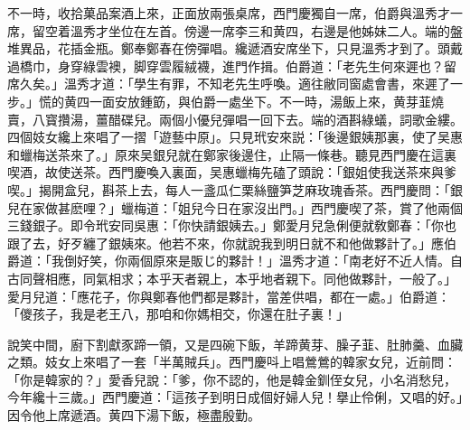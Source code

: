 不一時，收拾菓品案酒上來，正面放兩張桌席，西門慶獨自一席，伯爵與溫秀才一席，留空着溫秀才坐位在左首。傍邊一席李三和黄四，右邊是他姊妹二人。端的盤堆異品，花插金瓶。鄭奉鄭春在傍彈唱。纔遞酒安席坐下，只見溫秀才到了。頭戴過橋巾，身穿綠雲襖，脚穿雲履絨襪，進門作揖。伯爵道：「老先生何來遲也？留席久矣。」溫秀才道：「學生有罪，不知老先生呼喚。適往敝同窗處會書，來遲了一步。」慌的黄四一面安放鍾筯，與伯爵一處坐下。不一時，湯飯上來，黄芽韮燒賣，八寳攢湯，薑醋碟兒。兩個小優兒彈唱一回下去。端的酒斟綠蟻，詞歌金縷。四個妓女纔上來唱了一摺「遊藝中原」。只見玳安來説：「後邊銀姨那裏，使了吴惠和蠟梅送茶來了。」原來吴銀兒就在鄭家後邊住，止隔一條巷。聽見西門慶在這裏喫酒，故使送茶。西門慶喚入裏面，吴惠蠟梅先磕了頭說：「銀姐使我送茶來與爹喫。」揭開盒兒，斟茶上去，每人一盞瓜仁栗絲鹽笋芝麻玫瑰香茶。西門慶問：「銀兒在家做甚麽哩？」蠟梅道：「姐兒今日在家沒出門。」西門慶喫了茶，賞了他兩個三錢銀子。即令玳安同吳惠：「你快請銀姨去。」鄭愛月兒急俐便就敎鄭春：「你也跟了去，好歹纏了銀姨來。他若不來，你就說我到明日就不和他做夥計了。」應伯爵道：「我倒好笑，你兩個原來是販じ的夥計！」溫秀才道：「南老好不近人情。自古同聲相應，同氣相求；本乎天者親上，本乎地者親下。同他做夥計，一般了。」愛月兒道：「應花子，你與鄭春他們都是夥計，當差供唱，都在一處。」伯爵道：「儍孩子，我是老王八，那咱和你媽相交，你還在肚子裏！」

說笑中間，廚下割獻豕蹄一領，又是四碗下飯，羊蹄黄芽、臊子韮、肚肺羹、血臟之類。妓女上來唱了一套「半萬賊兵」。西門慶呌上唱鶯鶯的韓家女兒，近前問：「你是韓家的？」愛香兒說：「爹，你不認的，他是韓金釧侄女兒，小名消愁兒，今年纔十三歲。」西門慶道：「這孩子到明日成個好婦人兒！擧止伶俐，又唱的好。」因令他上席遞酒。黄四下湯下飯，極盡殷勤。

